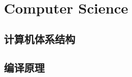 \documentclass[main.tex]{subfiles}
\begin{document}
\chapter{Computer Science}


\section{计算机体系结构}





\section{编译原理}
\end{document}
